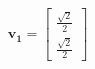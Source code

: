 \documentclass[preview]{standalone}
\begin{document}
\begin{align*}
\mathbf{v_1} = \begin{bmatrix} \frac{\sqrt{2}}{2} \\ \frac{\sqrt{2}}{2} \end{bmatrix}
\end{align*}
\end{document}
